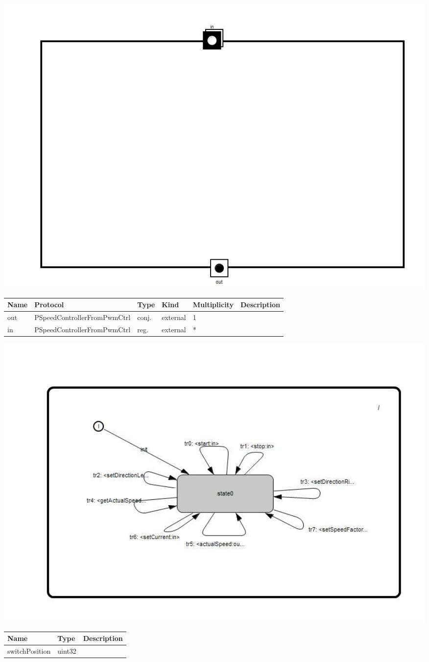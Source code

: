 
{
\centering{}
\includegraphics[width=1.0\textwidth]{./images/ASpeedControllerFromPwmCtrlMux_structure.jpg}
}

\begin{tabular}[ht]{|l|l|l|l|l|p{5cm}|}
\hline
\textbf{Name} & \textbf{Protocol} & \textbf{Type} & \textbf{Kind} & \textbf{Multiplicity} & \textbf{Description}\\
\hline
out & PSpeedControllerFromPwmCtrl & conj. & external & 1 & \\
\hline
in & PSpeedControllerFromPwmCtrl & reg. & external & * & \\
\hline
\end{tabular}

{
\centering{}
\includegraphics[width=1.0\textwidth]{./images/ASpeedControllerFromPwmCtrlMux_behavior.jpg}
}

\begin{par}

\end{par}


\begin{tabular}[ht]{|l|l|p{8cm}|}
\hline
\textbf{Name} & \textbf{Type} & \textbf{Description}\\
\hline
switchPosition & uint32 & \\
\hline
\end{tabular}

